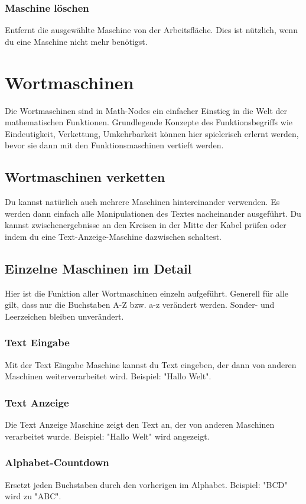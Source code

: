 \documentclass[12pt]{report}
\begin{document}
\subsubsection{Maschine löschen}
Entfernt die ausgewählte Maschine von der Arbeitsfläche. Dies ist nützlich, wenn du eine Maschine nicht mehr benötigst.
\section{Wortmaschinen}
Die Wortmaschinen sind in Math-Nodes ein einfacher Einstieg in die Welt der mathematischen Funktionen. Grundlegende Konzepte des Funktionsbegriffs wie Eindeutigkeit, Verkettung, Umkehrbarkeit können hier spielerisch erlernt werden, bevor sie dann mit den Funktionsmaschinen vertieft werden. 
\subsection{Wortmaschinen verketten}
Du kannst natürlich auch mehrere Maschinen hintereinander verwenden. Es werden dann einfach alle Manipulationen des Textes nacheinander ausgeführt. Du kannst zwischenergebnisse an den Kreisen in der Mitte der Kabel prüfen oder indem du eine Text-Anzeige-Maschine dazwischen schaltest.
\subsection{Einzelne Maschinen im Detail}
Hier ist die Funktion aller Wortmaschinen einzeln aufgeführt. Generell für alle gilt, dass nur die Buchstaben A-Z bzw. a-z verändert werden. Sonder- und Leerzeichen bleiben unverändert.
\subsubsection{Text Eingabe}
Mit der Text Eingabe Maschine kannst du Text eingeben, der dann von anderen Maschinen weiterverarbeitet wird. Beispiel: "Hallo Welt".

\subsubsection{Text Anzeige}
Die Text Anzeige Maschine zeigt den Text an, der von anderen Maschinen verarbeitet wurde. Beispiel: "Hallo Welt" wird angezeigt.

\subsubsection{Alphabet-Countdown}
Ersetzt jeden Buchstaben durch den vorherigen im Alphabet. Beispiel: "BCD" wird zu "ABC".
\end{document}
